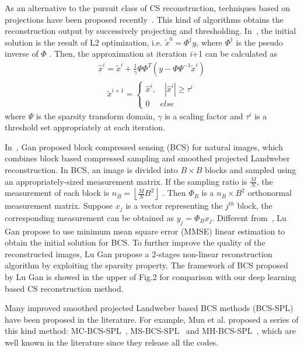 \documentclass[5pt]{article}
\begin{document}
As an alternative to the pursuit class of CS reconstruction, techniques based on projections have been proposed recently~\cite{rf1,rf10,rf18}. This kind of algorithms obtains the reconstruction output by successively projecting and thresholding. In~\cite{rf18}, the initial solution is the result of L2 optimization, i.e. ${\tilde x^0} = {\Phi ^\dag }y$, where ${\Phi ^\dag }$ is the pseudo inverse of $\Phi $ . Then, the approximation at iteration \emph{i}+1 can be calculated as
\begin{eqnarray}{\hat x^i} = {\tilde x^i} + \frac{1}{\gamma }\Psi {\Phi ^T}\left( {y - \Phi {\Psi ^{ - 1}}{{\tilde x}^i}} \right)
\end{eqnarray}
\begin{eqnarray}{\tilde x^{i + 1}} = \left\{ {\begin{array}{*{20}{c}}
{{{\hat x}^i},\quad \left| {{{\hat x}^i}} \right| \ge {\tau ^i}}\\
{0\;\quad else\;\;\;\;}
\end{array}} \right.
\end{eqnarray}
where $\Psi$ is the sparsity transform domain, $\gamma$ is a scaling factor and ${\tau ^i}$ is a threshold set appropriately at each iteration.

In~\cite{rf1}, Gan proposed block compressed sensing (BCS) for natural images, which combines block based compressed sampling and smoothed projected Landweber reconstruction. In BCS, an image is divided into $B \times B$ blocks and sampled using an appropriately-sized measurement matrix. If the sampling ratio is $\frac{M}{N}$, the measurement of each block is ${n_B} = \left\lfloor {\frac{M}{N}{B^2}} \right\rfloor $ . Then ${\Phi _B}$ is a ${n_B} \times {B^2}$ orthonormal measurement matrix. Suppose ${x_j}$ is a vector representing the ${j^{th}}$ block, the corresponding measurement can be obtained as ${y_j} = {\Phi _B}{x_j}$. Different from~\cite{rf18}, Lu Gan propose to use minimum mean square error (MMSE) linear estimation to obtain the initial solution for BCS. To further improve the quality of the reconstructed images, Lu Gan propose a 2-stages non-linear reconstruction algorithm by exploiting the sparsity property. The framework of BCS proposed by Lu Gan is showed in the upper of Fig.2 for comparison with our deep learning based CS reconstruction method.

Many improved smoothed projected Landweber based BCS methods (BCS-SPL) have been proposed in the literature. For example, Mun et al. proposed a series of this kind method: MC-BCS-SPL~\cite{rf19}, MS-BCS-SPL~\cite{rf20} and MH-BCS-SPL~\cite{rf10}, which are well known in the literature since they release all the codes.
\end{document}
